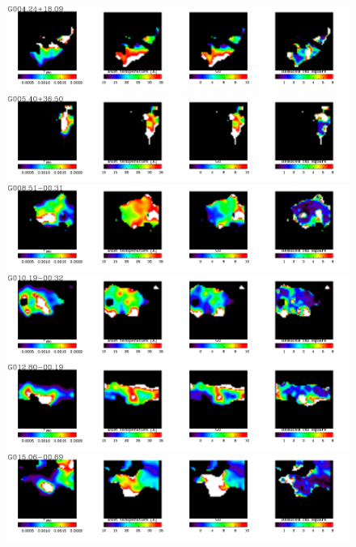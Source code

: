 \begin{figure}
\centering
\includegraphics[trim=0 2mm 0 0, clip, width=190mm]{appA/appA_0.pdf}
\includegraphics[trim=0 2mm 0 0, clip, width=190mm]{appA/appA_1.pdf}
\includegraphics[trim=0 2mm 0 0, clip, width=190mm]{appA/appA_2.pdf}
\includegraphics[trim=0 2mm 0 0, clip, width=190mm]{appA/appA_3.pdf}
\includegraphics[trim=0 2mm 0 0, clip, width=190mm]{appA/appA_4.pdf}
\includegraphics[trim=0 2mm 0 0, clip, width=190mm]{appA/appA_5.pdf}

  \end{figure}
  
